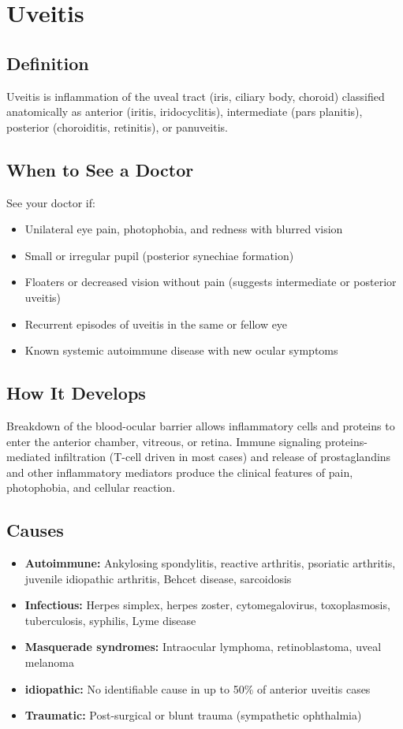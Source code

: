 \chapter{Uveitis}

\section*{Definition}
Uveitis is inflammation of the uveal tract (iris, ciliary body, choroid) classified anatomically as anterior (iritis, iridocyclitis), intermediate (pars planitis), posterior (choroiditis, retinitis), or panuveitis.

\section*{When to See a Doctor}
See your doctor if:
\begin{itemize}
  \item Unilateral eye pain, photophobia, and redness with blurred vision
  \item Small or irregular pupil (posterior synechiae formation)
  \item Floaters or decreased vision without pain (suggests intermediate or posterior uveitis)
  \item Recurrent episodes of uveitis in the same or fellow eye
  \item Known systemic autoimmune disease with new ocular symptoms
\end{itemize}

\section*{How It Develops}
Breakdown of the blood-ocular barrier allows inflammatory cells and proteins to enter the anterior chamber, vitreous, or retina. Immune signaling proteins-mediated infiltration (T-cell driven in most cases) and release of prostaglandins and other inflammatory mediators produce the clinical features of pain, photophobia, and cellular reaction.

\section*{Causes}
\begin{itemize}
  \item \textbf{Autoimmune:} Ankylosing spondylitis, reactive arthritis, psoriatic arthritis, juvenile idiopathic arthritis, Behcet disease, sarcoidosis
  \item \textbf{Infectious:} Herpes simplex, herpes zoster, cytomegalovirus, toxoplasmosis, tuberculosis, syphilis, Lyme disease
  \item \textbf{Masquerade syndromes:} Intraocular lymphoma, retinoblastoma, uveal melanoma
  \item \textbf{idiopathic:} No identifiable cause in up to 50\% of anterior uveitis cases
  \item \textbf{Traumatic:} Post-surgical or blunt trauma (sympathetic ophthalmia)
\end{itemize}

